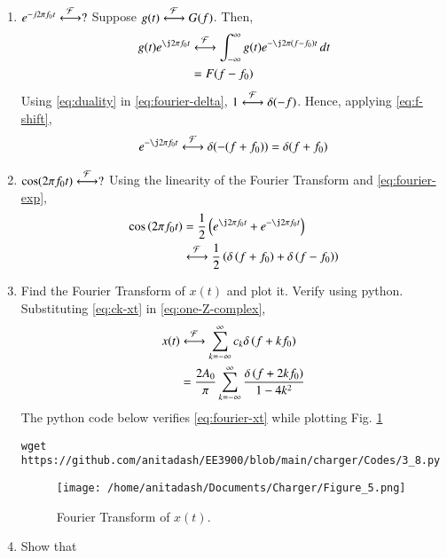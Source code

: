 \documentclass[journal,12pt,twocolumn]{IEEEtran}
\renewcommand\thesection{\arabic{section}}
\begin{document}
\begin{enumerate}[label=\thesection.\arabic*
,ref=\thesection.\theenumi]
\begin{align}
             &=\int_{-\infty}^{\infty}\delta(t)\, dt = 1
             \label{eq:fourier-delta}
\end{align}
\item $e^{-j2\pi f_0t}\overset{\mathcal{F}}{ \longleftrightarrow}?$
\solution Suppose $g(t)\overset{\mathcal{F}}{ \longleftrightarrow}G(f)$. Then,
\begin{align}
    g(t)e^{\j2\pi f_0t}&\system{F}\int_{-\infty}^{\infty}
                       g(t)e^{-\j2\pi\brak{f-f_0}t}\, dt \\
                       &=F(f-f_0)
                       \label{eq:f-shift}
\end{align}
Using \eqref{eq:duality} in \eqref{eq:fourier-delta}, $1\overset{\mathcal{F}}{ \longleftrightarrow}\delta(-f)$.
Hence, applying \eqref{eq:f-shift},
\begin{align}
    e^{-\j2\pi f_0t}\system{F}\delta(-(f+f_0)) = \delta(f+f_0)
    \label{eq:fourier-exp}
\end{align}
\item $\cos(2\pi f_0t)\overset{\mathcal{F}}{ \longleftrightarrow}?$
\solution Using the linearity of the Fourier 
Transform and \eqref{eq:fourier-exp},
\begin{align}
    \cos\brak{2\pi f_0t} &= \frac{1}{2}
                         \brak{e^{\j2\pi f_0t} + e^{-\j2\pi f_0t}} \\
                         &\system{F}\frac{1}{2}\brak{\delta\brak{f+f_0} + \delta\brak{f-f_0}}
\end{align}
\item Find the Fourier Transform of $x(t)$ and plot it. Verify using python.
\solution Substituting \eqref{eq:ck-xt} in \eqref{eq:one-Z-complex},
\begin{align}
    x(t)&\overset{\mathcal{F}}{ \longleftrightarrow}\sum_{k=-\infty}^{\infty}c_k\delta\left(f+kf_0\right) \\
        &=\frac{2A_0}{\pi}\sum_{k=-\infty}^{\infty}\frac{\delta\left(f+2kf_0\right)}{1-4k^2}
        \label{eq:fourier-xt}
\end{align}
The python code below verifies \eqref{eq:fourier-xt}
while plotting Fig. \ref{fig:fourier-xt}
\begin{lstlisting}
wget https://github.com/anitadash/EE3900/blob/main/charger/Codes/3_8.py
\end{lstlisting}
\begin{figure}[!ht]
    \texttt{[image: /home/anitadash/Documents/Charger/Figure\_5.png]}
    \caption{Fourier Transform of $x(t)$.}
    \label{fig:fourier-xt}
\end{figure}
\item Show that
\begin{align}

\end{align}
\end{enumerate}
\end{document}

